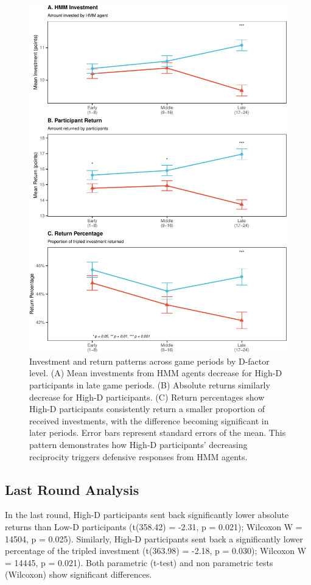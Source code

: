 \documentclass[
]{article}
\begin{document}
\begin{figure}
\includegraphics[width=0.9\linewidth]{article_files/figure-latex/gamesPlot2-1} \caption{Investment and return patterns across game periods by D-factor level. (A) Mean investments from HMM agents decrease for High-D participants in late game periods. (B) Absolute returns similarly decrease for High-D participants. (C) Return percentages show High-D participants consistently return a smaller proportion of received investments, with the difference becoming significant in later periods. Error bars represent standard errors of the mean. This pattern demonstrates how High-D participants' decreasing reciprocity triggers defensive responses from HMM agents.}\label{fig:gamesPlot2}
\end{figure}

\subsection{Last Round Analysis}\label{last-round-analysis}

In the last round, High-D participants sent back significantly lower absolute returns than Low-D participants (t(358.42) = -2.31, p = 0.021); Wilcoxon W = 14504, p = 0.025). Similarly, High-D participants sent back a significantly lower percentage of the tripled investment (t(363.98) = -2.18, p = 0.030); Wilcoxon W = 14445, p = 0.021). Both parametric (t-test) and non parametric tests (Wilcoxon) show significant differences.
\end{document}
